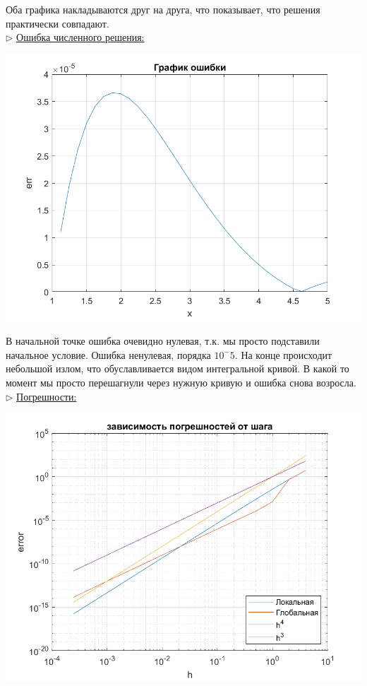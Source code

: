 \documentclass{article}
\begin{document}
	Оба графика накладываются друг на друга, что показывает, что решения практически совпадают.\\
	$\triangleright$ \underline{Ошибка численного решения:}
	\begin{center} \includegraphics[scale = 0.6]{ошибка} \end{center}
	В начальной точке ошибка очевидно нулевая, т.к. мы просто подставили начальное условие. Ошибка ненулевая, порядка $10^-5$. На конце происходит небольшой излом, что обуславливается видом интегральной кривой. В какой то момент мы просто перешагнули через нужную кривую и ошибка снова возросла.\\
	$\triangleright$ \underline{Погрешности:}
	\begin{center} \includegraphics[scale = 0.6]{погрешность} \end{center}
\end{document}

